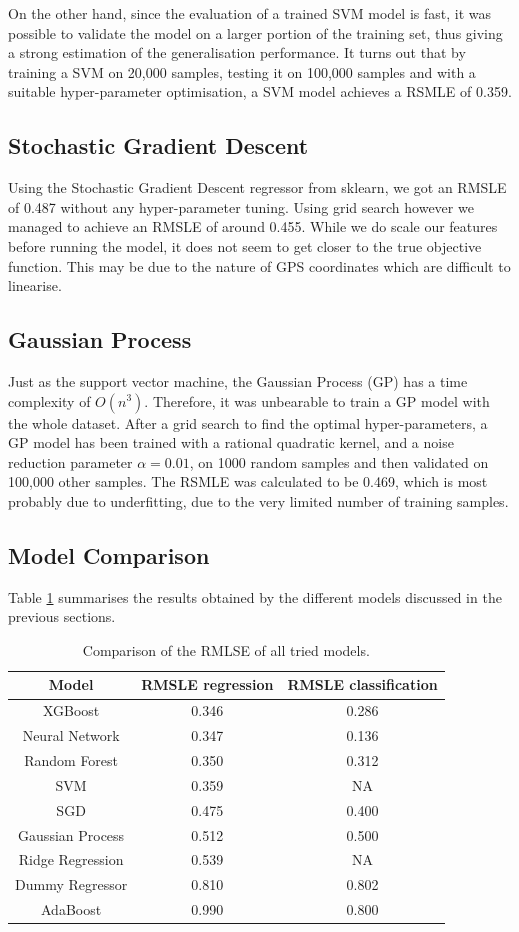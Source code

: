 \documentclass[a4paper]{article}
\begin{document}
On the other hand, since the evaluation of a trained SVM model is fast, it was
possible to validate the model on a larger portion of the training set, thus
giving a strong estimation of the generalisation performance. It turns out that
by training a SVM on 20,000 samples, testing it on 100,000 samples and with a
suitable hyper-parameter optimisation, a SVM model achieves a RSMLE of 0.359.

\subsection{Stochastic Gradient Descent}
Using the Stochastic Gradient Descent regressor from sklearn, we got an RMSLE of
0.487 without any hyper-parameter tuning. Using grid search however we managed to
achieve an RMSLE of around 0.455. While we do scale our features before running
the model, it does not seem to get closer to the true objective function. This
may be due to the nature of GPS coordinates which are difficult to linearise.

\subsection{Gaussian Process}
Just as the support vector machine, the Gaussian Process (GP) has a time
complexity of $O(n^3)$. Therefore, it was unbearable to train a GP model with
the whole dataset. After a grid search to find the optimal hyper-parameters, a
GP model has been trained with a rational quadratic kernel, and a noise
reduction parameter $\alpha=0.01$, on 1000 random samples and then validated on
100,000 other samples. The RSMLE was calculated to be 0.469, which is most
probably due to underfitting, due to the very limited number of training
samples.

\subsection{Model Comparison}
Table \ref{results} summarises the results obtained by the different models
discussed in the previous sections.
\begin{table}[h!]
    \centering
    \begin{tabular}{ccc}
        Model & RMSLE regression & RMSLE classification\\
        \hline
        XGBoost & 0.346 & 0.286 \\
        Neural Network & 0.347 & 0.136 \\
        Random Forest & 0.350 & 0.312 \\
        SVM & 0.359 & NA \\
        SGD & 0.475 & 0.400 \\
        Gaussian Process & 0.512 & 0.500 \\
        Ridge Regression & 0.539 & NA \\
        Dummy Regressor & 0.810 & 0.802 \\
        AdaBoost & 0.990 & 0.800 \\
        \hline
    \end{tabular}
    \caption{Comparison of the RMLSE of all tried models.}
    \label{results}
\end{table}
\end{document}
